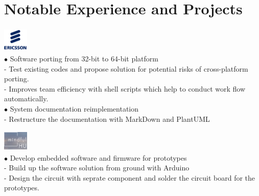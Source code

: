 \documentclass[12pt,a4paper,sans]{moderncv}        %
\begin{document}
\makecvtitle
\vspace{-40pt}
\normalsize
\section{Notable Experience and Projects}
\includegraphics[width=1.2cm,height=1.2cm]{Ericsson}\vspace{-32pt}\\
\hspace*{1.3cm}
{
\hspace*{1.3cm} $\bullet$ Software porting from 32-bit to 64-bit platform\\
\hspace*{1.37cm} - Test existing codes and propose solution for potential risks of cross-platform porting.\\
\hspace*{1.4cm} - Improves team efficiency with shell scripts which help to conduct work flow automatically.\vspace{3pt}\\
\hspace*{1.1cm} $\bullet$ System documentation reimplementation\\
\hspace*{1.4cm} - Restructure the documentation with MarkDown and PlantUML \\
}

\includegraphics[width=1.2cm,height=1cm]{mindfulhu} \vspace{-25pt}\\
\hspace*{1.3cm} 
{
\hspace*{1.3cm} $\bullet$ Develop embedded software and firmware for prototypes \\
\hspace*{1.37cm} - Build up the software solution from ground with Arduino\\
\hspace*{1.4cm} - Design the circuit with seprate component and solder the circuit board for the prototypes.\\
}
\end{document}
